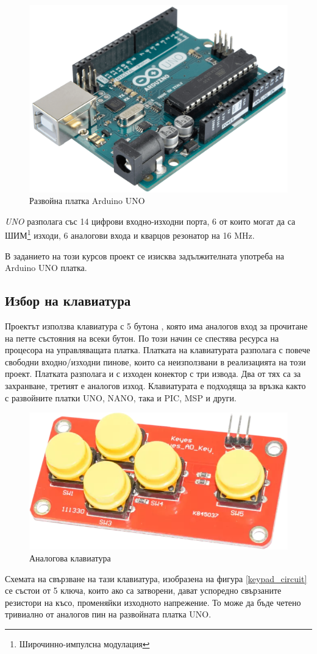 \documentclass[titlepage, oneside, 14pt]{extbook}
\newcommand{\ard}{Arduino\texttrademark{}}
\begin{document}
\begin{figure}[!htbp]
    \centering
    \includegraphics[width=0.5\linewidth]{img/arduino.png}
    \caption{Развойна платка \ard{} UNO}
\end{figure}

\textit{UNO} разполага със 14 цифрови входно-изходни порта, 6 от които могат да
са ШИМ\footnote{Широчинно-импулсна модулация} изходи, 6 аналогови входа и
кварцов резонатор на 16 MHz.

В заданието на този курсов проект се изисква задължителната употреба на \ard{} UNO
платка.

\subsection{Избор на клавиатура}

Проектът използва клавиатура с 5 бутона \cite{keypads}, която има аналогов вход за
прочитане на петте състояния на всеки бутон. По този начин се спестява ресурса
на процесора на управляващата платка. Платката на клавиатурата разполага с повече свободни входно/изходни
пинове, които са неизползвани в реализацията на този проект. Платката
разполага и с изходен конектор с три извода. Два от тях са за захранване, третият
е аналогов изход. Клавиатурата е подходяща за връзка както с развойните платки
UNO, NANO, така и PIC, MSP и други.

\begin{figure}[!htbp]
    \centering
    \includegraphics[width=0.5\linewidth]{img/keypad.png}
    \caption{Аналогова клавиатура}
\end{figure}

Схемата на свързване на тази клавиатура, изобразена на фигура \ref{keypad_circuit} се състои от 5 ключа, които ако са затворени,
дават успоредно свързаните резистори на късо, променяйки изходното напрежение. То може
да бъде четено тривиално от аналогов пин на развойната платка UNO.
\end{document}
